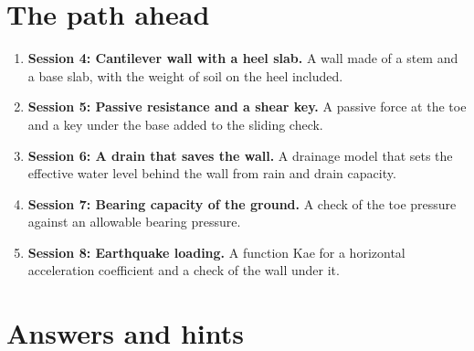 \documentclass[11pt,a4paper]{article}
\begin{document}
\section{The path ahead}
\begin{enumerate}[nosep]
\item \textbf{Session 4: Cantilever wall with a heel slab.} A wall made of a stem and a base slab, with the weight of soil on the heel included.
\item \textbf{Session 5: Passive resistance and a shear key.} A passive force at the toe and a key under the base added to the sliding check.
\item \textbf{Session 6: A drain that saves the wall.} A drainage model that sets the effective water level behind the wall from rain and drain capacity.
\item \textbf{Session 7: Bearing capacity of the ground.} A check of the toe pressure against an allowable bearing pressure.
\item \textbf{Session 8: Earthquake loading.} A function Kae for a horizontal acceleration coefficient and a check of the wall under it.
\end{enumerate}

\section{Answers and hints}
\end{document}
